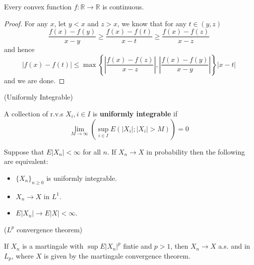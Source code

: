 \begin{proposition}
    Every convex function $f:\mathbb{R} \to \mathbb{R}$ is continuous. 
\end{proposition}
\begin{proof}
    For any $x$, let $y < x$ and $z >x$, we know that for any $t\in (y,z)$
    \[
    \dfrac{f(x)-f(y)}{x-y} \geq \dfrac{f(x)-f(t)}{x-t} \geq \dfrac{f(x)-f(z)}{x-z}
    \]
    and hence
    \[
    |f(x) - f(t)| \leq \max\left\{\left|\dfrac{f(x)-f(z)}{x-z}\right|,\left|\dfrac{f(x)-f(y)}{x-y}\right|\right\}|x-t|
    \]
    and we are done.
\end{proof}

\begin{definition}
    (Uniformly Integrable)\par
    A collection of r.v.s $X_i, i\in I$ is \textbf{uniformly integrable} if
    \[\lim_{M\to\infty} \left(\sup_{i\in I} E(|X_i|;|X_i| > M)\right) = 0\]    
\end{definition}

\begin{proposition}
    Suppose that $E|X_n| < \infty$ for all $n$. If $X_n \to X$ in probability then the following are equivalent:
    \begin{itemize}
        \item $\{X_n\}_{n\geq 0}$ is uniformly integrable.
        \item $X_n \to X$ in $L^1$.
        \item $E|X_n| \to E|X| < \infty$.
    \end{itemize}
\end{proposition}

\begin{theorem}
    ($L^p$ convergence theorem)\par
    If $X_n$ is a martingale with $\sup E|X_n|^p$ fintie and $p>1$, then $X_n \to X$ a.s. and in $L_p$, where $X$ is given by the martingale convergence theorem.
\end{theorem}

